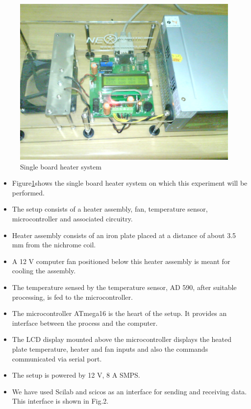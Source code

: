 \documentclass[12pt]{article}
\begin{document}
\begin{figure}[ht]
\centering
\includegraphics[width=\linewidth]{DSC00909}
\caption{Single board heater system}
\label{fig:sbhs}
\end{figure}
\begin{itemize}
\item 
Figure\ref{fig:sbhs}shows the single board heater system on which this experiment will be performed.
\item The setup consists of a heater assembly, fan, temperature sensor, microcontroller and associated circuitry.
\item Heater assembly consists of an iron plate placed at a distance of about 3.5 mm from the nichrome coil. 
\item A 12 V computer fan positioned below this heater assembly is meant for cooling the assembly.
\item The temperature sensed by the temperature sensor, AD 590, after suitable processing, is fed to the microcontroller.
\item The microcontroller ATmega16 is the heart of the setup. It provides an interface between the process and the computer.
\item The LCD display mounted above the microcontroller displays the heated plate temperature, heater and fan inputs and also the commands communicated via serial port. 
\item The setup is powered by 12 V, 8 A SMPS.
\item We have used Scilab and scicos as an interface for sending and receiving data. This interface is shown in Fig.2.\\
\end{itemize}
\end{document}
